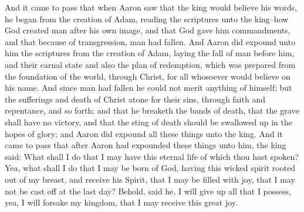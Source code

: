 And it came to pass that when Aaron saw that the king would believe his words, he began from the creation of Adam, reading the scriptures unto the king--how God created man after his own image, and that God gave him commandments, and that because of transgression, man had fallen.
\bverse \iffalse And Aaron did expound unto him the scriptures from the creation of Adam, laying the fall of man before him, and their carnal state and also the plan of redemption, which was prepared from the foundation of the world, through Christ, for all whosoever would believe on his name. \fi
And Aaron did expound unto him the scriptures from the creation of Adam, laying the fall of man before him, and their carnal state and also the plan of redemption, which was prepared from the foundation of the world, through Christ, for all whosoever would believe on his name.
\bverse \iffalse And since man had fallen he could not merit anything of himself; but the sufferings and death of Christ atone for their sins, through faith and repentance, and so forth; and that he breaketh the bands of death, that the grave shall have no victory, and that the sting of death should be swallowed up in the hopes of glory; and Aaron did expound all these things unto the king. \fi
And since man had fallen he could not merit anything of himself; but the sufferings and death of Christ atone for their sins, through faith and repentance, and so forth; and that he breaketh the bands of death, that the grave shall have no victory, and that the sting of death should be swallowed up in the hopes of glory; and Aaron did expound all these things unto the king.
\bverse \iffalse And it came to pass that after Aaron had expounded these things unto him, the king said: What shall I do that I may have this eternal life of which thou hast spoken? Yea, what shall I do that I may be born of God, having this wicked spirit rooted out of my breast, and receive his Spirit, that I may be filled with joy, that I may not be cast off at the last day? Behold, said he, I will give up all that I possess, yea, I will forsake my kingdom, that I may receive this great joy. \fi
And it came to pass that after Aaron had expounded these things unto him, the king said: What shall I do that I may have this eternal life of which thou hast spoken? Yea, what shall I do that I may be born of God, having this wicked spirit rooted out of my breast, and receive his Spirit, that I may be filled with joy, that I may not be cast off at the last day? Behold, said he, I will give up all that I possess, yea, I will forsake my kingdom, that I may receive this great joy.
